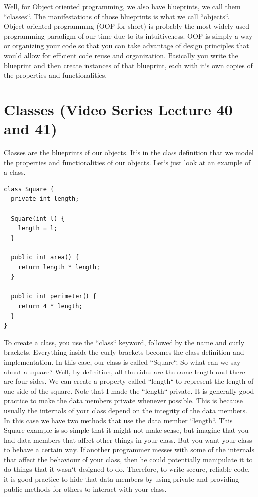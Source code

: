 \documentclass[11]{article}
\begin{document}
Well, for Object oriented programming, we also have blueprints, we call them ``classes``. The manifestations of those blueprints is what we call ``objects``.\\

Object oriented programming (OOP for short) is probably the most widely used programming paradigm of our time due to its intuitiveness. OOP is simply a way or organizing your code so that you can take advantage of design principles that would allow for efficient code reuse and organization. Basically you write the blueprint and then create instances of that blueprint, each with it`s own copies of the properties and functionalities.\\

\section{Classes (Video Series Lecture 40 and 41)}
Classes are the blueprints of our objects. It`s in the class definition that we model the properties and functionalities of our objects. Let`s just look at an example of a class.
\newpage
\begin{lstlisting}
class Square {
  private int length;

  Square(int l) {
    length = l;
  }

  public int area() {
    return length * length;
  }

  public int perimeter() {
    return 4 * length;
  }
}
\end{lstlisting}

To create a class, you use the ``class`` keyword, followed by the name and curly brackets. Everything inside the curly brackets becomes the class definition and implementation. In this case, our class is called ``Square``. So what can we say about a square? Well, by definition, all the sides are the same length and there are four sides. We can create a property called 	``length`` to represent the length of one side of the square. Note that I made the ``length`` private. It is generally good practice to make the data members private whenever possible. This is because usually the internals of your class depend on the integrity of the data members. In this case we have two methods that use the data member ``length``. This Square example is so simple that it might not make sense, but imagine that you had data members that affect other things in your class. But you want your class to behave a certain way. If another programmer messes with some of the internals that affect the behaviour of your class, then he could potentially manipulate it to do things that it wasn`t designed to do. Therefore, to write secure, reliable code, it is good practice to hide that data members by using private and providing public methods for others to interact with your class.
\end{document}
